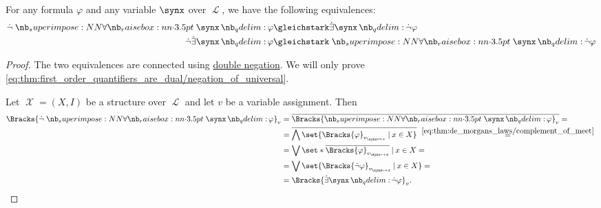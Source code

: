 \begin{concept}\label{con:syntactic_abbreviation}
\end{concept}

\begin{proposition}\label{thm:first_order_quantifiers_are_dual}
  For any formula \( \varphi \) and any variable \( \synx \) over \( \mscrL \), we have the following equivalences:
  \begin{align}
    \synneg \qforall \synx \varphi &\gleichstark \qexists \synx \synneg \varphi \label{eq:thm:first_order_quantifiers_are_dual/negation_of_universal} \\
    \synneg \qexists \synx \varphi &\gleichstark \qforall \synx \synneg \varphi \label{eq:thm:first_order_quantifiers_are_dual/negation_of_existential}
  \end{align}
\end{proposition}
\begin{proof}
  The two equivalences are connected using \hyperref[thm:classical_equivalences/double_negation]{double negation}. We will only prove \eqref{eq:thm:first_order_quantifiers_are_dual/negation_of_universal}.

  Let \( \mscrX = (X, I) \) be a structure over \( \mscrL \) and let \( v \) be a variable assignment. Then
  \begin{align*}
    \Bracks{ \synneg \qforall \synx \varphi }_v
    &=
    \oline{\Bracks{ \qforall \synx \varphi }_v}
    = \\ &=
    \oline{\bigwedge\set{ \Bracks{\varphi}_{v_{\synx \mapsto x}} \given x \in X }}
    \reloset {\eqref{eq:thm:de_morgans_laws/complement_of_meet}} = \\ &=
    \bigvee\set*{ \oline{\Bracks{\varphi}_{v_{\synx \mapsto x}}} \given x \in X }
    = \\ &=
    \bigvee\set{ \Bracks{\synneg \varphi}_{v_{\synx \mapsto x}} \given x \in X }
    = \\ &=
    \Bracks{\qexists \synx \synneg \varphi}_v.
  \end{align*}
\end{proof}

